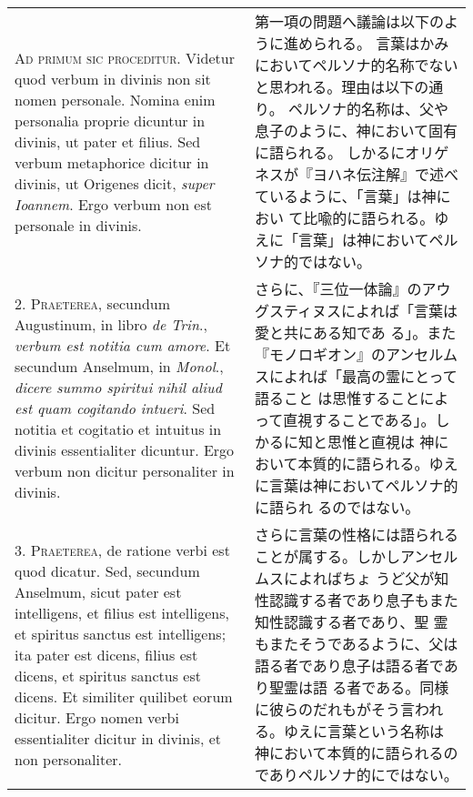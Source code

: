 \documentclass[10pt]{jsarticle} %
\begin{document}
\begin{longtable}{p{21em}p{21em}}

{\scshape Ad primum sic proceditur}. Videtur quod verbum in divinis non sit nomen
 personale. Nomina enim personalia proprie dicuntur in divinis, ut
 pater et filius. Sed verbum metaphorice dicitur in divinis, ut
 Origenes dicit, {\itshape super Ioannem}. Ergo verbum non est personale in
 divinis.

&

第一項の問題へ議論は以下のように進められる。
言葉はかみにおいてペルソナ的名称でないと思われる。理由は以下の通り。
ペルソナ的名称は、父や息子のように、神において固有に語られる。
しかるにオリゲネスが『ヨハネ伝注解』で述べているように、「言葉」は神におい
 て比喩的に語られる。ゆえに「言葉」は神においてペルソナ的ではない。



\\




2. {\scshape Praeterea}, secundum Augustinum, in libro {\itshape de Trin}., {\itshape verbum est notitia
 cum amore}. Et secundum Anselmum, in {\itshape Monol}., {\itshape dicere summo spiritui
 nihil aliud est quam cogitando intueri}. Sed notitia et cogitatio et
 intuitus in divinis essentialiter dicuntur. Ergo verbum non dicitur
 personaliter in divinis.

&

さらに、『三位一体論』のアウグスティヌスによれば「言葉は愛と共にある知であ
 る」。また『モノロギオン』のアンセルムスによれば「最高の霊にとって語ること
 は思惟することによって直視することである」。しかるに知と思惟と直視は
 神において本質的に語られる。ゆえに言葉は神においてペルソナ的に語られ
 るのではない。

\\




3. {\scshape Praeterea}, de ratione verbi est quod dicatur. Sed, secundum Anselmum,
 sicut pater est intelligens, et filius est intelligens, et spiritus
 sanctus est intelligens; ita pater est dicens, filius est dicens, et
 spiritus sanctus est dicens. Et similiter quilibet eorum
 dicitur. Ergo nomen verbi essentialiter dicitur in divinis, et non
 personaliter.

&

さらに言葉の性格には語られることが属する。しかしアンセルムスによればちょ
 うど父が知性認識する者であり息子もまた知性認識する者であり、聖
 霊もまたそうであるように、父は語る者であり息子は語る者であり聖霊は語
 る者である。同様に彼らのだれもがそう言われる。ゆえに言葉という名称は
 神において本質的に語られるのでありペルソナ的にではない。


\end{longtable}
\end{document}
